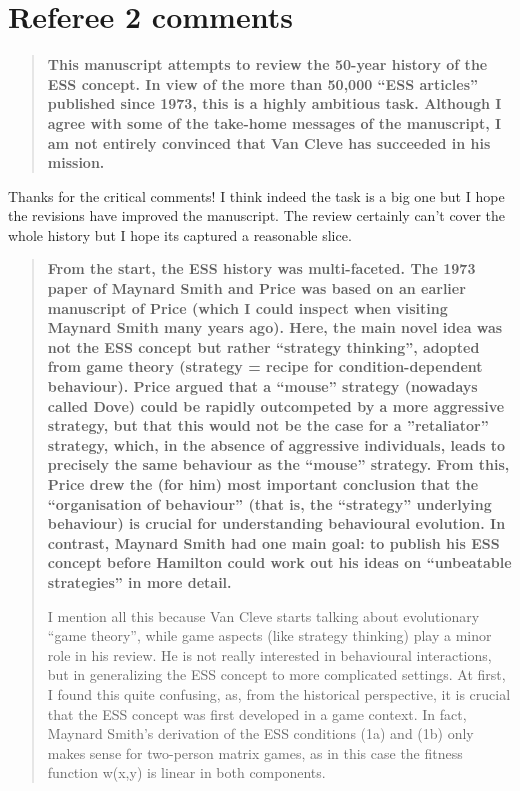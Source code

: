 \documentclass[10pt,parskip=full,foldmarks=off,addrfield=off,backaddress=false,refline=dateleft,letterpaper]{scrlttr2}
\newenvironment{reviewerquote}{\begin{quote}\color{DarkBlue}\bfseries}{\end{quote}}
\begin{document}
\begin{letter}
\section{Referee 2 comments}

\begin{reviewerquote}
This manuscript attempts to review the 50-year history of the ESS concept. In view of the more than 50,000 “ESS articles” published since 1973, this is a highly ambitious task. Although I agree with some of the take-home messages of the manuscript, I am not entirely convinced that Van Cleve has succeeded in his mission.
\end{reviewerquote}

Thanks for the critical comments! I think indeed the task is a big one but I hope the revisions have improved the manuscript. The review certainly can't cover the whole history but I hope its captured a reasonable slice.

\begin{reviewerquote}
From the start, the ESS history was multi-faceted. The 1973 paper of Maynard Smith and Price was based on an earlier manuscript of Price (which I could inspect when visiting Maynard Smith many years ago). Here, the main novel idea was not the ESS concept but rather “strategy thinking”, adopted from game theory (strategy = recipe for condition-dependent behaviour). Price argued that a “mouse” strategy (nowadays called Dove) could be rapidly outcompeted by a more aggressive strategy, but that this would not be the case for a ”retaliator” strategy, which, in the absence of aggressive individuals, leads to precisely the same behaviour as the “mouse” strategy. From this, Price drew the (for him) most important conclusion that the “organisation of behaviour” (that is, the “strategy” underlying behaviour) is crucial for understanding behavioural evolution. In contrast, Maynard Smith had one main goal: to publish his ESS concept before Hamilton could work out his ideas on “unbeatable strategies” in more detail.

I mention all this because Van Cleve starts talking about evolutionary “game theory”, while game aspects (like strategy thinking) play a minor role in his review. He is not really interested in behavioural interactions, but in generalizing the ESS concept to more complicated settings. At first, I found this quite confusing, as, from the historical perspective, it is crucial that the ESS concept was first developed in a game context. In fact, Maynard Smith’s derivation of the ESS conditions (1a) and (1b) only makes sense for two-person matrix games, as in this case the fitness function w(x,y) is linear in both components.
\end{reviewerquote}


\end{letter}
\end{document}
